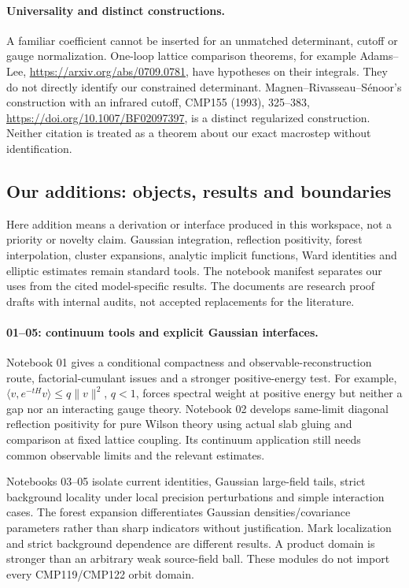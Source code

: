 \documentclass[11pt]{article}
\theoremstyle{remark}
\begin{document}
\paragraph{Universality and distinct constructions.}
A familiar coefficient cannot be inserted for an
unmatched determinant, cutoff or gauge normalization.
One-loop lattice comparison theorems, for example
Adams--Lee,
\url{https://arxiv.org/abs/0709.0781},
have hypotheses on their integrals. They do not
directly identify our constrained determinant.
Magnen--Rivasseau--S\'enoor's construction with
an infrared cutoff, CMP155 (1993), 325--383,
\url{https://doi.org/10.1007/BF02097397},
is a distinct regularized construction. Neither
citation is treated as a theorem about our exact
macrostep without identification.

\subsection{Our additions: objects, results and boundaries}
\label{hrb-additions}

Here addition means a derivation or interface produced
in this workspace, not a priority or novelty claim.
Gaussian integration, reflection positivity, forest
interpolation, cluster expansions, analytic implicit
functions, Ward identities and elliptic estimates
remain standard tools. The notebook manifest separates
our uses from the cited model-specific results.
The documents are research proof drafts with internal
audits, not accepted replacements for the literature.

\paragraph{01--05: continuum tools and explicit Gaussian interfaces.}
Notebook 01 gives a conditional compactness and
observable-reconstruction route, factorial-cumulant
issues and a stronger positive-energy test.
For example,
\(\langle v,e^{-tH}v\rangle\leq q\|v\|^2\), \(q<1\),
forces spectral weight at positive energy but
neither a gap nor an interacting gauge theory.
Notebook 02 develops same-limit diagonal reflection
positivity for pure Wilson theory using actual
slab gluing and comparison at fixed lattice coupling.
Its continuum application still needs common
observable limits and the relevant estimates.

Notebooks 03--05 isolate current identities,
Gaussian large-field tails, strict background
locality under local precision perturbations and
simple interaction cases. The forest expansion
differentiates Gaussian densities/covariance
parameters rather than sharp indicators without
justification. Mark localization and strict
background dependence are different results.
A product domain is stronger than an arbitrary
weak source-field ball. These modules do not
import every CMP119/CMP122 orbit domain.
\end{document}
